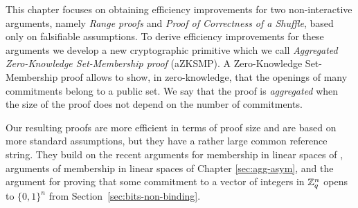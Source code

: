 This chapter focuses on obtaining efficiency improvements for two non-interactive arguments, namely \emph{Range proofs} and \emph{Proof of Correctness of a Shuffle}, based only on falsifiable assumptions.  To derive efficiency improvements for these arguments we develop a new cryptographic primitive which we call \emph{Aggregated Zero-Knowledge Set-Membership proof} (aZKSMP). A Zero-Knowledge Set-Membership proof allows to show, in zero-knowledge, that the openings of many commitments belong to a public set. We say that the proof is \emph{aggregated} when the size of the proof does not depend on the number of commitments.

Our resulting proofs are more efficient in terms of proof size and are based on more standard assumptions, but they have a rather large common reference string. They build on the recent arguments for membership in linear spaces of \cite{EC:LPJY14,C:JutRoy14,EC:KilWee15}, arguments of membership in linear spaces of Chapter \ref{sec:agg-asym}, and the argument for proving that some commitment to a vector of integers in $\mathbb{Z}_q^{n}$ opens to $\{0,1\}^n$ from Section~\ref{sec:bits-non-binding}.
 
